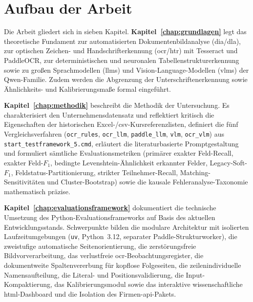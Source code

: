 \section{Aufbau der Arbeit}
\label{sec:aufbau}

Die Arbeit gliedert sich in sieben Kapitel. \textbf{Kapitel~\ref{chap:grundlagen}} legt das theoretische Fundament zur automatisierten Dokumentenbildanalyse (\ac{dia}/\ac{dla}), zur optischen Zeichen- und Handschrifterkennung (\ac{ocr}/\ac{htr}) mit Tesseract und PaddleOCR, zur deterministischen und neuronalen Tabellenstrukturerkennung sowie zu großen Sprachmodellen (\acp{llm}) und Vision-Language-Modellen (\acp{vlm}) der Qwen-Familie. Zudem werden die Abgrenzung der Unterschriftenerkennung sowie Ähnlichkeits- und Kalibrierungsmaße formal eingeführt.

\textbf{Kapitel~\ref{chap:methodik}} beschreibt die Methodik der Untersuchung. Es charakterisiert den Unternehmensdatensatz und reflektiert kritisch die Eigenschaften der historischen Excel-/\ac{csv}-Kursreferenzlisten, definiert die fünf Vergleichsverfahren (\texttt{ocr\_rules}, \texttt{ocr\_llm}, \texttt{paddle\_llm}, \texttt{vlm}, \texttt{ocr\_vlm}) aus \texttt{start\_testframework\_5.cmd}, erläutert die literaturbasierte Promptgestaltung und formuliert sämtliche Evaluationsmetriken (primärer exakter Feld-Recall, exakter Feld-$F_1$, bedingte Levenshtein-Ähnlichkeit erkannter Felder, Legacy-Soft-$F_1$, Feldstatus-Partitionierung, strikter Teilnehmer-Recall, Matching-Sensitivitäten und Cluster-Bootstrap) sowie die kausale Fehleranalyse-Taxonomie mathematisch präzise.

\textbf{Kapitel~\ref{chap:evaluationsframework}} dokumentiert die technische Umsetzung des Python-Evaluationsframeworks auf Basis des aktuellen Entwicklungsstands. Schwerpunkte bilden die modulare Architektur mit isolierten Laufzeitumgebungen (\texttt{uv}, Python~3.12, separater Paddle-Strukturworker), die zweistufige automatische Seitenorientierung, die zerstörungsfreie Bildvorverarbeitung, das verlustfreie \ac{ocr}-Beobachtungsregister, die dokumentweite Spaltenvererbung für kopflose Folgeseiten, die zeilenindividuelle Namensaufteilung, die Literal- und Positionsvalidierung, die Input-Kompaktierung, das Kalibrierungsmodul sowie das interaktive wissenschaftliche \ac{html}-Dashboard und die Isolation des Firmen-\ac{api}-Pakets.

